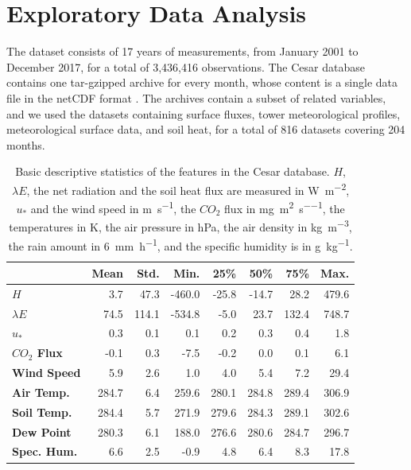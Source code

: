 \documentclass[a4paper,11pt]{kth-mag}
\begin{document}
\section{Exploratory Data Analysis}
\label{sec:eda}
The dataset consists of 17 years of measurements, from January 2001 to December 2017, for a total of 3,436,416 observations. The Cesar database contains one tar-gzipped archive for every month, whose content is a single data file in the netCDF format \citep{netcdf}. The archives contain a subset of related variables, and we used the datasets containing surface fluxes, tower meteorological profiles, meteorological surface  data, and soil heat, for a total of 816 datasets covering 204 months.


\begin{table}
\centering
\caption{Basic descriptive statistics of the features in the Cesar database. $H$, $\lambda E$, the net radiation and the soil heat flux are measured in \si{\watt\per\square\meter}, $u_*$ and the wind speed in \si{\meter\per\second}, the $CO_2$ flux in \si{\milli\gram\per\square\meter\per\second}, the temperatures in \si{\kelvin}, the air pressure in \si{\hecto\pascal}, the air density in \si{\kilo\gram\per\cubic\meter}, the rain amount in \SI{6}{\milli\meter\per\hour}, and the specific humidity is in \si{\gram\per\kilo\gram}.}
\label{tbl:col_summary}
\begin{tabular*}{\textwidth}{l| @{\extracolsep{\fill}} rrrrrrr}
\toprule
& \textbf{Mean} & \textbf{Std.} & \textbf{Min.} & \textbf{25\%} & \textbf{50\%} & \textbf{75\%} & \textbf{Max.} \\ \midrule
\textbf{$H$} & 3.7 & 47.3 & -460.0 & -25.8 & -14.7 & 28.2 & 479.6 \\
\textbf{$\lambda E$} & 74.5 & 114.1 & -534.8 & -5.0 & 23.7 & 132.4 & 748.7 \\
\textbf{$u_*$} & 0.3 & 0.1 & 0.1 & 0.2 & 0.3 & 0.4 & 1.8  \\
\textbf{$CO_2$ Flux} & -0.1 & 0.3 & -7.5 & -0.2 & 0.0 & 0.1 & 6.1  \\
\hline
\textbf{Wind Speed} & 5.9 & 2.6 & 1.0 & 4.0 & 5.4 & 7.2 & 29.4  \\
\textbf{Air Temp.} & 284.7 & 6.4 & 259.6 & 280.1 & 284.8 & 289.4 & 306.9 \\
\textbf{Soil Temp.} & 284.4 & 5.7 & 271.9 & 279.6 & 284.3 & 289.1 & 302.6 \\ 
\textbf{Dew Point} & 280.3 & 6.1 & 188.0 & 276.6 & 280.6 & 284.7 & 296.7 \\
\textbf{Spec. Hum.} & 6.6 & 2.5 & -0.9 & 4.8 & 6.4 & 8.3 & 17.8 \\

\end{tabular*}
\end{table}
\end{document}
